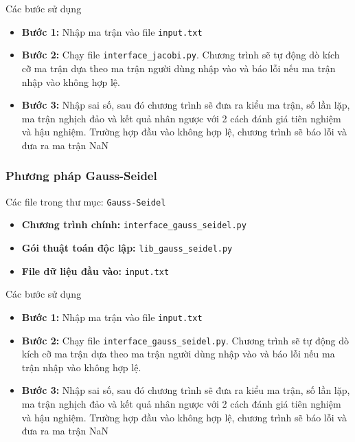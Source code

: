             \par Các bước sử dụng
            \begin{itemize}
                \item \textbf{Bước 1:} Nhập ma trận vào file \texttt{input.txt}
                \item \textbf{Bước 2:} Chạy file \texttt{interface\_jacobi.py}. Chương trình sẽ tự động dò kích cỡ ma trận dựa theo ma trận người dùng nhập vào và báo lỗi nếu ma trận nhập vào không hợp lệ.
                \item \textbf{Bước 3:} Nhập sai số, sau đó chương trình sẽ đưa ra kiểu ma trận, số lần lặp, ma trận nghịch đảo và kết quả nhân ngược với 2 cách đánh giá tiên nghiệm và hậu nghiệm. Trường hợp đầu vào không hợp lệ, chương trình sẽ báo lỗi và đưa ra ma trận NaN
            \end{itemize}

        \subsubsection{Phương pháp Gauss-Seidel}

            \par Các file trong thư mục: \texttt{Gauss-Seidel}
            \begin{itemize}
                \item \textbf{Chương trình chính:} \texttt{interface\_gauss\_seidel.py}
                \item \textbf{Gói thuật toán độc lập:} \texttt{lib\_gauss\_seidel.py}
                \item \textbf{File dữ liệu đầu vào:} \texttt{input.txt}
            \end{itemize}

            \par Các bước sử dụng
            \begin{itemize}
                \item \textbf{Bước 1:} Nhập ma trận vào file \texttt{input.txt}
                \item \textbf{Bước 2:} Chạy file \texttt{interface\_gauss\_seidel.py}. Chương trình sẽ tự động dò kích cỡ ma trận dựa theo ma trận người dùng nhập vào và báo lỗi nếu ma trận nhập vào không hợp lệ.
                \item \textbf{Bước 3:} Nhập sai số, sau đó chương trình sẽ đưa ra kiểu ma trận, số lần lặp, ma trận nghịch đảo và kết quả nhân ngược với 2 cách đánh giá tiên nghiệm và hậu nghiệm. Trường hợp đầu vào không hợp lệ, chương trình sẽ báo lỗi và đưa ra ma trận NaN
            \end{itemize}